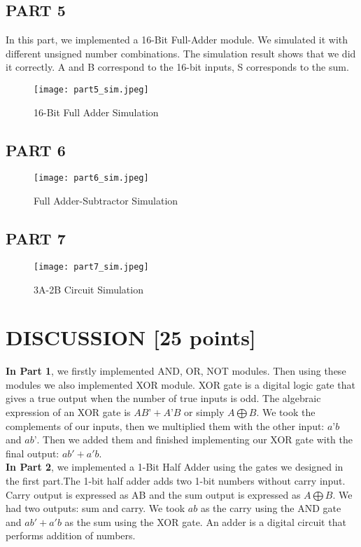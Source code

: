 \documentclass[pdftex,12pt,a4paper]{article}
\begin{document}
\subsection{PART 5}
In this part, we implemented a 16-Bit Full-Adder module. We simulated it with different unsigned number combinations. The simulation result shows that we did it correctly. A and B correspond to the 16-bit inputs, S corresponds to the sum.

\begin{figure}[ht]
	\centering
	\texttt{[image: part5\_sim.jpeg]}	
	\caption{16-Bit Full Adder Simulation}
	\label{fig14}
\end{figure}
\subsection{PART 6}

\begin{figure}[ht]
	\centering
	\texttt{[image: part6\_sim.jpeg]}	
	\caption{Full Adder-Subtractor Simulation}
	\label{fig18}
\end{figure}

\subsection{PART 7}

\begin{figure}[ht]
	\centering
	\texttt{[image: part7\_sim.jpeg]}	
	\caption{3A-2B Circuit Simulation}
	\label{fig19}
\end{figure}

\section{DISCUSSION [25 points]}



\textbf{In Part 1}, we firstly implemented AND, OR, NOT modules. Then using these modules we also implemented XOR module. XOR gate is a digital logic gate that gives a true output when the number of true inputs is odd. The algebraic expression of an XOR gate is \(AB’+A’B\) or simply \(A⨁B\). We took the complements of our inputs, then we multiplied them with the other input: \(a’b\) and \(ab’\). Then we added them and finished implementing our XOR gate with the final output: \(ab'+a'b\).  \\


\textbf{In Part 2}, we implemented a 1-Bit Half Adder using the gates we designed in the first part.The 1-bit half adder adds two 1-bit numbers without carry input. Carry output is expressed as AB and the sum output is expressed as \(A⨁B.\) We had two outputs: sum and carry. We took \(ab\) as the carry using the AND gate and \(ab'+a'b\) as the sum using the XOR gate. An adder is a digital circuit that performs addition of numbers. \\
\end{document}
